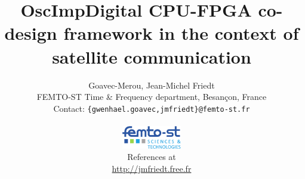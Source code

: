 \documentclass[compress,10pt]{beamer}
\begin{document}
\author[G. Goeavec- Merou \& al.]{Goavec-Merou, Jean-Michel Friedt\\
{\footnotesize
FEMTO-ST Time \& Frequency department, Besan\c con, France \\ 
}
Contact: {\tt \{gwenhael.goavec,jmfriedt\}@femto-st.fr} \\ \vspace{0.6cm}
\begin{minipage}[t]{\linewidth}
\begin{minipage}{.25\linewidth}
\includegraphics[height=1cm]{logo_femto.pdf}
\end{minipage}
\begin{minipage}{.47\linewidth}
\begin{center}
References at \\
\url{http://jmfriedt.free.fr}
\end{center}
\end{minipage}
\begin{minipage}{.21\linewidth}
\end{minipage}
\end{minipage}%
}
\title[]{OscImpDigital CPU-FPGA co-design framework in the context of satellite communication}

\begin{frame}
\titlepage
\end{frame}

\end{document}

